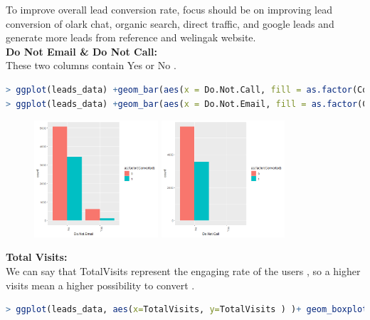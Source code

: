 To improve overall lead conversion rate, focus should be on improving lead conversion of olark chat, organic search, direct traffic, and google leads and generate more leads from reference and welingak website.\\
\textbf{Do Not Email & Do Not Call: }\\
These two columns contain Yes or No .  
\begin{lstlisting}[language=R]
> ggplot(leads_data) +geom_bar(aes(x = Do.Not.Call, fill = as.factor(Converted)), position = "dodge") + theme(axis.text.x = element_text(angle = 90))
> ggplot(leads_data) +geom_bar(aes(x = Do.Not.Email, fill = as.factor(Converted)), position = "dodge") + theme(axis.text.x = element_text(angle = 90))
\end{lstlisting}
\begin{figure}[H]
	\begin{center}
		\includegraphics[width=0.41\textwidth]{assets/email.png}	
		\includegraphics[width=0.41\textwidth]{assets/call.png}
	\end{center}
\end{figure}
\textbf{Total Visits: }\\
We can say that TotalVisits represent the engaging rate of the users , so a higher visits mean a higher possibility to convert . 
\begin{lstlisting}[language=R]
> ggplot(leads_data, aes(x=TotalVisits, y=TotalVisits ) )+ geom_boxplot(fill='steelblue') +  labs(x='TotalVisits') + coord_flip()
\end{lstlisting}
